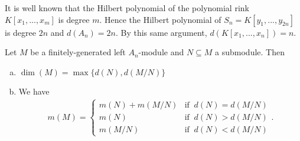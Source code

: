 \begin{example}\label{example:dim-of-Weyl-algebra}
	It is well known that the Hilbert polynomial of the polynomial rink $K[x_1,...,x_m]$ is degree $m$. Hence the Hilbert polynomial of $S_n = K[y_1,...,y_{2n}]$ is degree $2n$ and $d(A_n) = 2n$. By this same argument, $d(K[x_1,...,x_n]) = n$. 
\end{example}
\begin{prop}\label{prop:basic-dim-properties-A_n}
	Let $M$ be a finitely-generated left $A_n$-module and $N \subseteq M$ a submodule. Then
	\begin{enumerate}[(a)]
		\item $\dim(M) = \max\{d(N),d(M/N)\}$ 
		\item We have
			\begin{align*}
				m(M) = 
				\begin{cases}
					m(N) + m(M/N) & \text{if }~ d(N) = d(M/N) \\
					m(N) & \text{if }~ d(N) > d(M/N) \\
					m(M/N) & \text{if }~ d(N) < d(M/N)
				\end{cases}.
			\end{align*}
	\end{enumerate}
\end{prop}
